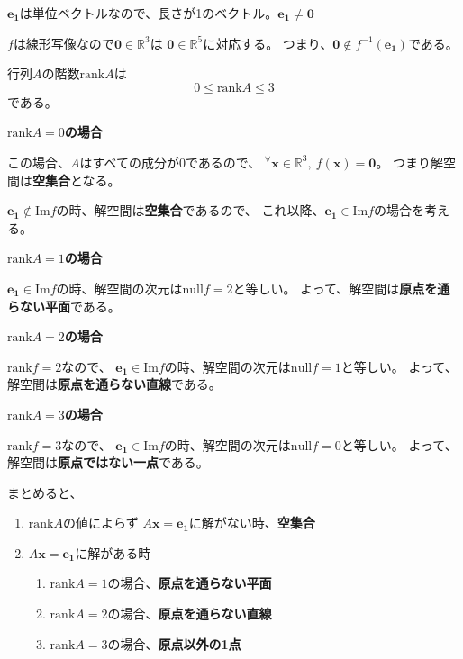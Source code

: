 \documentclass[12pt,b5paper]{ltjsarticle}
\begin{document}
\begin{enumerate}
       $\bm{e_1}$は単位ベクトルなので、長さが1のベクトル。$\bm{e_1}\ne \bm{0}$

       $f$は線形写像なので$\bm{0}\in\mathbb{R}^3$は
       $\bm{0}\in\mathbb{R}^5$に対応する。
       つまり、$\bm{0}\not\in f^{-1}(\bm{e_1})$である。

       行列$A$の階数$\mathrm{rank}A$は
       \begin{equation}
        0 \leq \mathrm{rank}A \leq 3
       \end{equation}
       である。

       \textbf{$\mathrm{rank}A=0$の場合}

       この場合、$A$はすべての成分が$0$であるので、
       ${}^\forall \bm{x} \in \mathbb{R}^3 , \ f(\bm{x})=\bm{0}$。
       つまり解空間は\textbf{空集合}となる。

       $\bm{e_1}\not\in\mathrm{Im}f$の時、解空間は\textbf{空集合}であるので、
       これ以降、$\bm{e_1}\in\mathrm{Im}f$の場合を考える。

       \textbf{$\mathrm{rank}A=1$の場合}

       $\bm{e_1}\in\mathrm{Im}f$の時、解空間の次元は$\mathrm{null}f=2$と等しい。
       よって、解空間は\textbf{原点を通らない平面}である。

       \textbf{$\mathrm{rank}A=2$の場合}

       $\mathrm{rank}f=2$なので、
       $\bm{e_1}\in\mathrm{Im}f$の時、解空間の次元は$\mathrm{null}f=1$と等しい。
       よって、解空間は\textbf{原点を通らない直線}である。

       \textbf{$\mathrm{rank}A=3$の場合}

       $\mathrm{rank}f=3$なので、
       $\bm{e_1}\in\mathrm{Im}f$の時、解空間の次元は$\mathrm{null}f=0$と等しい。
       よって、解空間は\textbf{原点ではない一点}である。

       \vspace*{10pt}

       まとめると、
       \begin{enumerate}
        \item $\mathrm{rank}A$の値によらず $A\bm{x}=\bm{e_1}$に解がない時、\textbf{空集合}
        \item $A\bm{x}=\bm{e_1}$に解がある時
              \begin{enumerate}
               \item $\mathrm{rank}A=1$の場合、\textbf{原点を通らない平面}
               \item $\mathrm{rank}A=2$の場合、\textbf{原点を通らない直線}
               \item $\mathrm{rank}A=3$の場合、\textbf{原点以外の1点}
              \end{enumerate}
       \end{enumerate}


       \hrulefill
\end{enumerate}
\end{document}
